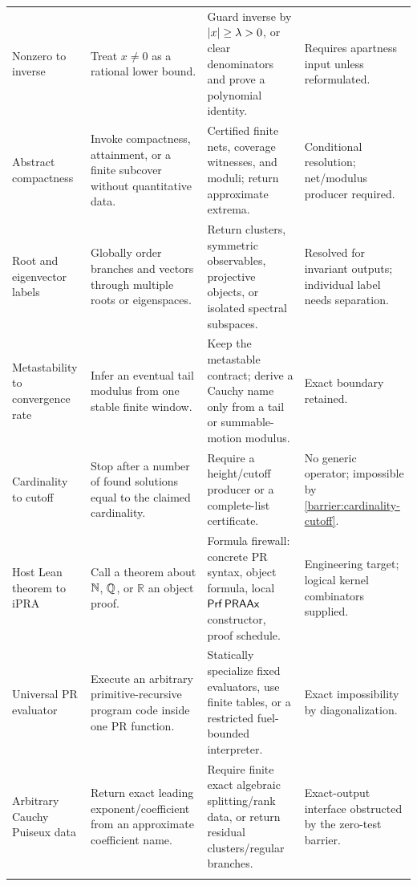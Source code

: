 \begin{longtable}{@{}p{}p{}p{}p{}@{}}
Nonzero to inverse & Treat \(x\ne0\) as a rational lower bound. & Guard inverse by
\(\lvert x\rvert\ge\lambda>0\), or clear denominators and prove a polynomial identity. &
Requires apartness input unless reformulated. \\
\addlinespace

Abstract compactness & Invoke compactness, attainment, or a finite subcover without
quantitative data. & Certified finite nets, coverage witnesses, and moduli; return
approximate extrema. & Conditional resolution; net/modulus producer required. \\
\addlinespace

Root and eigenvector labels & Globally order branches and vectors through
multiple roots or eigenspaces. & Return clusters, symmetric observables, projective
objects, or isolated spectral subspaces. & Resolved for invariant outputs; individual
label needs separation. \\
\addlinespace

Metastability to convergence rate & Infer an eventual tail modulus from one stable
finite window. & Keep the metastable contract; derive a Cauchy name only from a tail or
summable-motion modulus. & Exact boundary retained. \\
\addlinespace

Cardinality to cutoff & Stop after a number of found solutions equal to the claimed
cardinality. & Require a height/cutoff producer or a complete-list certificate. & No
generic operator; impossible by \cref{barrier:cardinality-cutoff}. \\
\addlinespace

Host Lean theorem to iPRA & Call a theorem about \(\mathbb N\), \(\mathbb Q\), or \(\mathbb R\) an
object proof. & Formula firewall: concrete PR syntax, object formula, local
\(\mathsf{Prf}\,\mathsf{PRAAx}\) constructor, proof schedule. & Engineering target; logical kernel
combinators supplied. \\
\addlinespace

Universal PR evaluator & Execute an arbitrary primitive-recursive program code inside
one PR function. & Statically specialize fixed evaluators, use finite tables, or a
restricted fuel-bounded interpreter. & Exact impossibility by diagonalization. \\
\addlinespace

Arbitrary Cauchy Puiseux data & Return exact leading exponent/coefficient from an
approximate coefficient name. & Require finite exact algebraic splitting/rank data, or
return residual clusters/regular branches. & Exact-output interface obstructed by the
zero-test barrier. \\
\addlinespace


\end{longtable}

